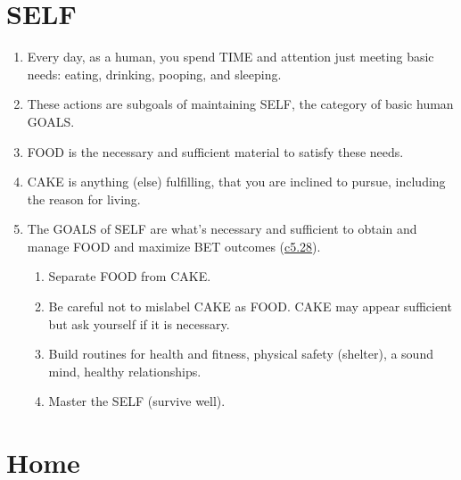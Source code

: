 \documentclass[
]{book}
\providecommand{\tightlist}{%
  \setlength{\itemsep}{0pt}\setlength{\parskip}{0pt}}
\begin{document}
\hypertarget{self-1}{%
\section{SELF}\label{self-1}}

\begin{enumerate}
\def\labelenumi{\arabic{enumi}.}
\setcounter{enumi}{53}
\tightlist
\item
  Every day, as a human, you spend TIME and attention just meeting basic needs:
  eating, drinking, pooping, and sleeping.
\item
  These actions are subgoals of maintaining SELF, the category of basic human GOALS.
\item
  FOOD is the necessary and sufficient material to satisfy these needs.
\item
  CAKE is anything (else) fulfilling, that you are inclined to pursue, including the reason for living.
\item
  The GOALS of SELF are what's necessary and sufficient to obtain and manage FOOD and maximize BET outcomes (\protect\hyperlink{bet-2}{c5.28}).

  \begin{enumerate}
  \def\labelenumii{\arabic{enumii}.}
  \tightlist
  \item
    Separate FOOD from CAKE.
  \item
    Be careful not to mislabel CAKE as FOOD. CAKE may appear sufficient but ask yourself if it is necessary.
  \item
    Build routines for health and fitness, physical safety (shelter), a sound
    mind, healthy relationships.
  \item
    Master the SELF (survive well).
  \end{enumerate}
\end{enumerate}

\hypertarget{home}{%
\section{Home}\label{home}}
\end{document}
